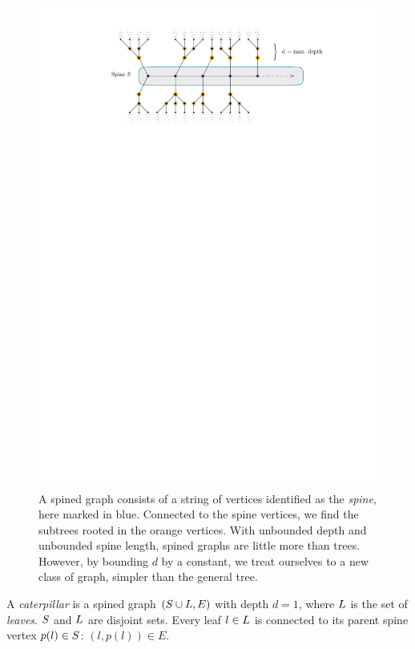 \begin{figure}
    \centering
    \includegraphics{graphics/ch2_spinedgraph.pdf}
    \caption{A spined graph consists of a string of vertices identified as the \emph{spine}, here marked in blue. Connected to the spine vertices, we find the subtrees rooted in the orange vertices. With unbounded depth and unbounded spine length, spined graphs are little more than trees. However, by bounding $d$ by a constant, we treat ourselves to a new class of graph, simpler than the general tree.}
    \label{fig:ch2_spinedgraph}
\end{figure}

A \emph{caterpillar} is a spined graph $(S \cup L, E)$ with depth $d=1$, where $L$ is the set of \emph{leaves}. $S$ and $L$ are disjoint sets. Every leaf $l \in L$ is connected to its parent spine vertex $p(l) \in S$: $(l, p(l)) \in E$.

